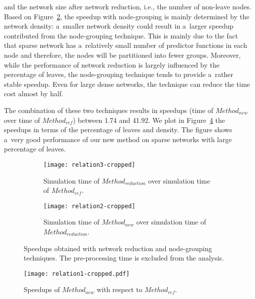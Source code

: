 \documentclass[runningheads,a4paper]{llncs}
\begin{document}
and the network size after network reduction, i.e., the number of non-leave nodes. Based on
Figure~\ref{fig:speedup2}, the speedup with node-grouping is mainly determined by the network
density: a~smaller network density could result in a~larger speedup contributed from the
node-grouping technique. This is mainly due to the fact that sparse network has a~relatively small
number of predictor functions in each node and therefore, the nodes will be partitioned into fewer
groups. Moreover, while the performance of network reduction is largely influenced by the
percentage of leaves, the node-grouping technique tends to provide a~rather stable speedup. Even
for large dense networks, the technique can reduce the time cost almost by half.

The combination of these two techniques results in speedups (time of {\sf $Method_{new}$} over
time of {\sf $Method_{ref}$}) between 1.74 and 41.92. We plot in Figure~\ref{fig:speedup3} the
speedups in terms of the percentage of leaves and density. The figure shows a~very good
performance of our new method on sparse networks with large percentage of leaves.
%
\begin{figure}[!t]
  \centering
  \begin{subfigure}[b]{0.48\textwidth}
    \centering
    \texttt{[image: relation3-cropped]}
    \caption{Simulation time of {\sf $Method_{reduction}$} over simulation time of
     {\sf $Method_{ref}$}.}
    \label{fig:speedup1}
  \end{subfigure}%
  \quad
  \begin{subfigure}[b]{0.48\textwidth}
    \centering
    \texttt{[image: relation2-cropped]}
    \caption{Simulation time of {\sf $Method_{new}$} over simulation time of
     {\sf $Method_{reduction}$}.}
    \label{fig:speedup2}
  \end{subfigure}
  \caption{Speedups obtained with network reduction and node-grouping techniques. The
  pre-processing time is excluded from the analysis.}
  \label{fig:speedups}
\end{figure}

\begin{figure}[!t]
\centering
\texttt{[image: relation1-cropped.pdf]}
\caption{Speedups of {\sf $Method_{new}$} with respect to {\sf $Method_{ref}$}.}
\label{fig:speedup3}
\end{figure}
\end{document}
